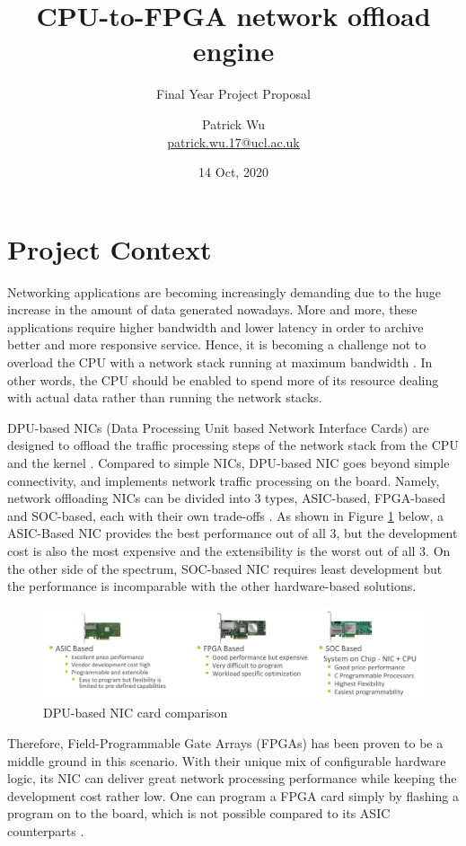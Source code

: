 \documentclass[a4paper,11pt]{scrartcl}
\title{CPU-to-FPGA network offload engine}
\subtitle{Final Year Project Proposal}
\author{Patrick Wu\\ \url{patrick.wu.17@ucl.ac.uk}}
\date{14 Oct, 2020}
\begin{document}
\maketitle

\section{Project Context}
Networking applications are becoming increasingly demanding due to the huge increase in the amount of data generated nowadays. More and more, these applications require higher bandwidth and lower latency in order to archive better and more responsive service. Hence, it is becoming a challenge not to overload the CPU with a network stack running at maximum bandwidth \cite{chen-2018}. In other words, the CPU should be enabled to spend more of its resource dealing with actual data rather than running the network stacks.

DPU-based NICs (Data Processing Unit based Network Interface Cards) are designed to offload the traffic processing steps of the network stack from the CPU and the kernel \cite{mellanox}. Compared to simple NICs, DPU-based NIC goes beyond simple connectivity, and implements network traffic processing on the board. Namely, network offloading NICs can be divided into 3 types, ASIC-based, FPGA-based and SOC-based, each with their own trade-offs \cite{mellanox}. As shown in Figure \ref{nic-comparison} below, a ASIC-Based NIC provides the best performance out of all 3, but the development cost is also the most expensive and the extensibility is the worst out of all 3. On the other side of the spectrum, SOC-based NIC requires least development but the performance is incomparable with the other hardware-based solutions.
\begin{figure}[h]
    \includegraphics[width=\textwidth]{imgs/nic1-1.jpg}
    \caption{DPU-based NIC card comparison}
    \label{nic-comparison}
\end{figure}

Therefore, Field-Programmable Gate Arrays (FPGAs) has been proven to be a middle ground in this scenario. With their unique mix of configurable hardware logic, its NIC can deliver great network processing performance while keeping the development cost rather low. One can program a FPGA card simply by flashing a program on to the board, which is not possible compared to its ASIC counterparts \cite{4068926}.
\end{document}
